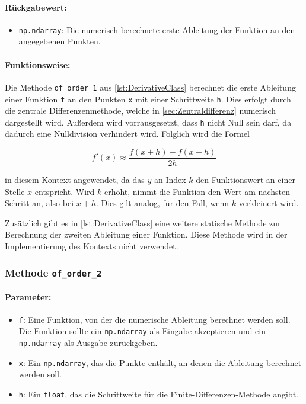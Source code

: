 \paragraph{Rückgabewert:}
\begin{itemize}
    \item \texttt{np.ndarray}: Die numerisch berechnete erste Ableitung der Funktion an den angegebenen Punkten.
\end{itemize}

\paragraph{Funktionsweise:}
Die Methode \texttt{of\_order\_1} aus \ref{lst:DerivativeClass} berechnet die erste Ableitung einer Funktion \texttt{f} an den Punkten \texttt{x} mit einer Schrittweite \texttt{h}. Dies erfolgt durch die zentrale Differenzenmethode, welche in \ref{sec:Zentraldifferenz} numerisch dargestellt wird. Außerdem wird vorrausgesetzt, dass \texttt{h} nicht Null sein darf, da dadurch eine Nulldivision verhindert wird. Folglich wird die Formel

\[ f'(x) \approx \frac{f(x + h) - f(x - h)}{2h} \]

in diesem Kontext angewendet, da das $y$ an Index $k$ den Funktionswert an einer Stelle $x$ entspricht. Wird $k$ erhöht, nimmt die Funktion den Wert am nächsten Schritt an, also bei $x + h$. Dies gilt analog, für den Fall, wenn $k$ verkleinert wird.

Zusätzlich gibt es in \ref{lst:DerivativeClass} eine weitere statische Methode zur Berechnung der zweiten Ableitung einer Funktion. Diese Methode wird in der Implementierung des Kontexts nicht verwendet.

\subsubsection{Methode \texttt{of\_order\_2}}

\paragraph{Parameter:}
\begin{itemize}
    \item \texttt{f}: Eine Funktion, von der die numerische Ableitung berechnet werden soll. Die Funktion sollte ein \texttt{np.ndarray} als Eingabe akzeptieren und ein \texttt{np.ndarray} als Ausgabe zurückgeben.
    \item \texttt{x}: Ein \texttt{np.ndarray}, das die Punkte enthält, an denen die Ableitung berechnet werden soll.
    \item \texttt{h}: Ein \texttt{float}, das die Schrittweite für die Finite-Differenzen-Methode angibt.
\end{itemize}

